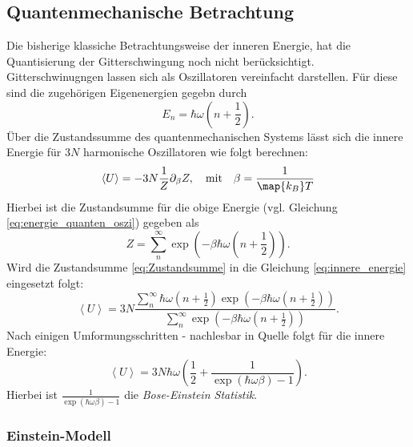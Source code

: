 \subsection{Quantenmechanische Betrachtung}
Die bisherige klassiche Betrachtungsweise der inneren Energie, hat die
Quantisierung der Gitterschwingung noch nicht berücksichtigt.
Gitterschwinugngen lassen sich als Oszillatoren vereinfacht darstellen. Für diese
sind die zugehörigen Eigenenergien gegebn durch
\begin{equation}
  \label{eq:energie_quanten_oszi}
  E_n = \hbar \omega \left(n + \frac{1}{2}\right).
\end{equation}
Über die Zustandssumme des quantenmechanischen Systems lässt sich die innere Energie
für $3N$ harmonische Oszillatoren wie folgt berechnen:
\begin{equation}
  \label{eq:innere_energie}
  \left<U\right> = -3N\frac{1}{Z}\partial_\beta Z, \quad \text{mit} \quad \beta = \frac{1}{\map{k_B}T}
\end{equation}
Hierbei ist die Zustandsumme für die obige Energie (vgl. Gleichung \eqref{eq:energie_quanten_oszi})
gegeben als
\begin{equation}
  \label{eq:Zustandsumme}
  Z = \sum_n^\infty \exp\left(-\beta\hbar\omega\left(n+\frac{1}{2}\right)\right).
\end{equation}
Wird die Zustandsumme \eqref{eq:Zustandsumme} in die Gleichung \eqref{eq:innere_energie}
eingesetzt folgt:
\begin{equation*}
  \left<U\right>= 3N  \frac{ \sum_n^\infty \hbar\omega\left( n+ \frac{1}{2} \right)\exp\left(-\beta\hbar\omega\left( n+\frac{1}{2} \right) \right) }{ \sum_n^\infty \exp\left( -\beta\hbar\omega\left( n+\frac{1}{2} \right) \right)}.
\end{equation*}
Nach einigen Umformungsschritten - nachlesbar in Quelle \cite[S. 220]{marx} folgt für die innere Energie:
\begin{equation}
  \label{eq:innere_Energie_Quantenmechanik_diskrete}
  \left<U\right> = 3N\hbar\omega\left(\frac{1}{2} + \frac{1}{\exp\left(\hbar\omega\beta\right) -1}\right).
\end{equation}
Hierbei ist $\frac{1}{\exp\left(\hbar\omega\beta\right) -1}$ die \emph{Bose-Einstein Statistik}.

\subsubsection{Einstein-Modell}
